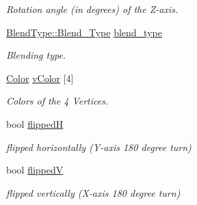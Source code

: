 \begin{DoxyCompactItemize}
\begin{DoxyCompactList}\small\item\em Rotation angle (in degrees) of the Z-\/axis. \item\end{DoxyCompactList}\item 
\hypertarget{class_f2_c_1_1_sprite_base_a24e4acd632808884f0c5e573afbdbb4a}{
\hyperlink{namespace_f2_c_1_1_blend_type_a582fe2d83fb813041785794568e5a414}{BlendType::Blend\_\-Type} \hyperlink{class_f2_c_1_1_sprite_base_a24e4acd632808884f0c5e573afbdbb4a}{blend\_\-type}}
\label{class_f2_c_1_1_sprite_base_a24e4acd632808884f0c5e573afbdbb4a}

\begin{DoxyCompactList}\small\item\em Blending type. \item\end{DoxyCompactList}\item 
\hyperlink{class_f2_c_1_1_color}{Color} \hyperlink{class_f2_c_1_1_sprite_base_ae05d180666e3750a5d5f909f04e686c4}{vColor} \mbox{[}4\mbox{]}
\begin{DoxyCompactList}\small\item\em Colors of the 4 Vertices. \item\end{DoxyCompactList}\item 
\hypertarget{class_f2_c_1_1_sprite_base_a1360a92b9ab1b65e77bf21ffab082be7}{
bool \hyperlink{class_f2_c_1_1_sprite_base_a1360a92b9ab1b65e77bf21ffab082be7}{flippedH}}
\label{class_f2_c_1_1_sprite_base_a1360a92b9ab1b65e77bf21ffab082be7}

\begin{DoxyCompactList}\small\item\em flipped horizontally (Y-\/axis 180 degree turn) \item\end{DoxyCompactList}\item 
\hypertarget{class_f2_c_1_1_sprite_base_a4ee02d18d2d3637c176d0f32dcdfaf32}{
bool \hyperlink{class_f2_c_1_1_sprite_base_a4ee02d18d2d3637c176d0f32dcdfaf32}{flippedV}}
\label{class_f2_c_1_1_sprite_base_a4ee02d18d2d3637c176d0f32dcdfaf32}

\begin{DoxyCompactList}\small\item\em flipped vertically (X-\/axis 180 degree turn) \item\end{DoxyCompactList}\end{DoxyCompactItemize}
